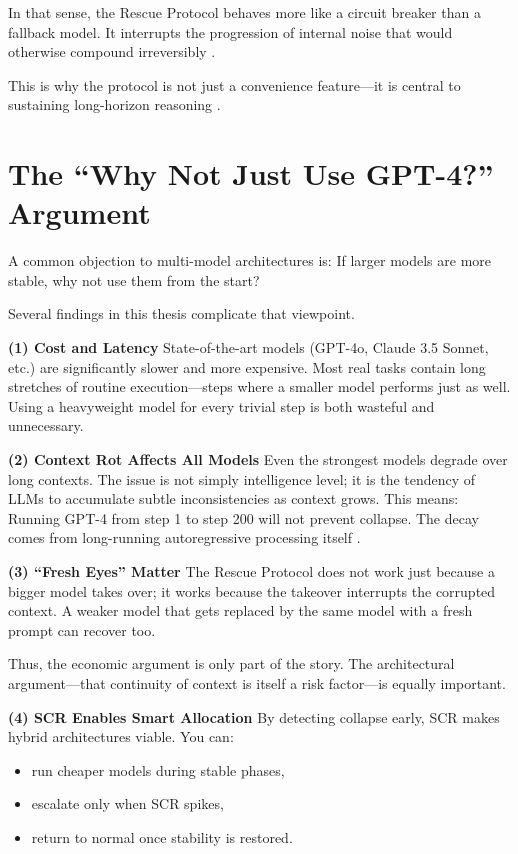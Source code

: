 \documentclass[12pt,a4paper]{report}
\begin{document}
In that sense, the Rescue Protocol behaves more like a circuit breaker than a fallback model. It interrupts the progression of internal noise that would otherwise compound irreversibly \cite{Chen2023ToolEmu, Zhou2024ToolSandbox}.

This is why the protocol is not just a convenience feature—it is central to sustaining long-horizon reasoning \cite{Chen2024HiAgent, Zhang2025ContextFolding}.

\section{The “Why Not Just Use GPT-4?” Argument}
A common objection to multi-model architectures is: If larger models are more stable, why not use them from the start?

Several findings in this thesis complicate that viewpoint.

\textbf{(1) Cost and Latency}
State-of-the-art models (GPT-4o, Claude 3.5 Sonnet, etc.) are significantly slower and more expensive. Most real tasks contain long stretches of routine execution—steps where a smaller model performs just as well. Using a heavyweight model for every trivial step is both wasteful and unnecessary.

\textbf{(2) Context Rot Affects All Models}
Even the strongest models degrade over long contexts. The issue is not simply intelligence level; it is the tendency of LLMs to accumulate subtle inconsistencies as context grows. This means: Running GPT-4 from step 1 to step 200 will not prevent collapse. The decay comes from long-running autoregressive processing itself \cite{Wang2025ComplexityTrap, Zhang2025ContextFolding, Chen2024HiAgent}.

\textbf{(3) “Fresh Eyes” Matter}
The Rescue Protocol does not work just because a bigger model takes over; it works because the takeover interrupts the corrupted context. A weaker model that gets replaced by the same model with a fresh prompt can recover too.

Thus, the economic argument is only part of the story. The architectural argument—that continuity of context is itself a risk factor—is equally important.

\textbf{(4) SCR Enables Smart Allocation}
By detecting collapse early, SCR makes hybrid architectures viable. You can:
\begin{itemize}
    \item run cheaper models during stable phases,
    \item escalate only when SCR spikes,
    \item return to normal once stability is restored.
\end{itemize}
\end{document}
